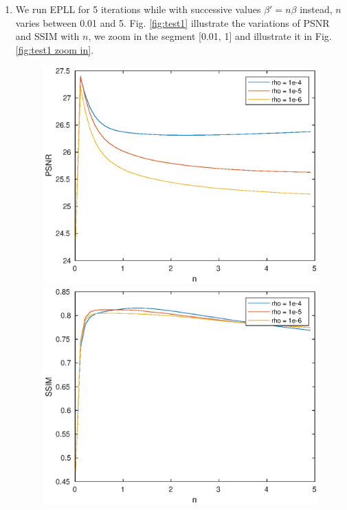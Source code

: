 \documentclass[12pt,a4paper]{article}
\begin{document}
\begin{enumerate}
    \item We run EPLL for 5 iterations while with successive values $\beta' = n\beta$ instead, $n$ varies between 0.01 and 5. Fig. \ref{fig:test1} illustrate the variations of PSNR and SSIM with $n$, we zoom in the segment [0.01, 1] and illustrate it in Fig. \ref{fig:test1 zoom in}. 
    \begin{figure}[h]
        \begin{minipage}[t]{.5\textwidth}
          \centerline{\includegraphics[scale=0.5]{times_beta_serie_psnr.eps}}
        \end{minipage}
       \begin{minipage}[t]{.5\textwidth}
          \centerline{\includegraphics[scale=0.5]{times_beta_serie_ssim.eps}}

\end{minipage}
\end{figure}
\end{enumerate}
\end{document}
